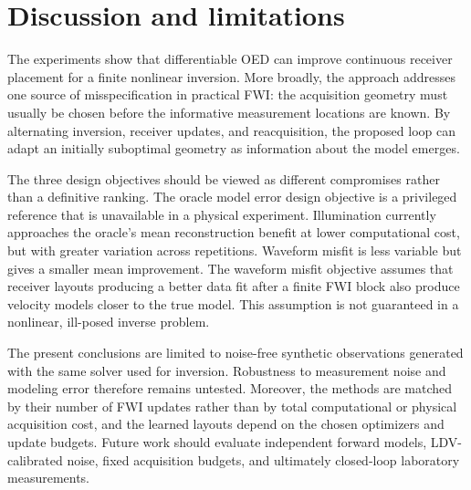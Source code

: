 \section{Discussion and limitations}

The experiments show that differentiable OED can improve continuous receiver
placement for a finite nonlinear inversion. More broadly, the approach addresses
one source of misspecification in practical FWI: the acquisition geometry must
usually be chosen before the informative measurement locations are known. By
alternating inversion, receiver updates, and reacquisition, the proposed loop
can adapt an initially suboptimal geometry as information about the model
emerges.

The three design objectives should be viewed as different compromises rather than a
definitive ranking. The oracle model error design objective is a privileged reference that is unavailable in a physical experiment. Illumination
currently approaches the oracle’s mean reconstruction benefit at lower computational
cost, but with greater variation across repetitions. Waveform misfit is less
variable but gives a smaller mean improvement. The waveform misfit objective assumes that receiver layouts producing a better data fit after a finite FWI block also produce velocity models closer to the true model. This assumption is not guaranteed in a nonlinear, ill-posed inverse problem.

The present conclusions are limited to noise-free synthetic observations
generated with the same solver used for inversion. Robustness to measurement
noise and modeling error therefore remains untested. Moreover, the methods are
matched by their number of FWI updates rather than by total computational or
physical acquisition cost, and the learned layouts depend on the chosen
optimizers and update budgets. Future work should evaluate independent forward
models, LDV-calibrated noise, fixed acquisition budgets, and ultimately
closed-loop laboratory measurements.



